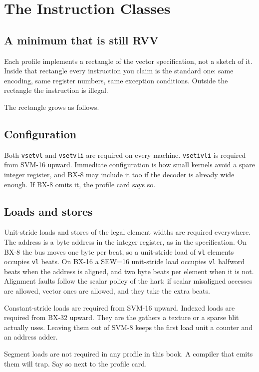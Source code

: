 \chapter{The Instruction Classes}
\label{ch:instructions}

\section{A minimum that is still RVV}

Each profile implements a rectangle of the vector specification, not a sketch of it. Inside that rectangle every instruction you claim is the standard one: same encoding, same register numbers, same exception conditions. Outside the rectangle the instruction is illegal.

The rectangle grows as follows.

\section{Configuration}

Both \texttt{vsetvl} and \texttt{vsetvli} are required on every machine. \texttt{vsetivli} is required from SVM-16 upward. Immediate configuration is how small kernels avoid a spare integer register, and BX-8 may include it too if the decoder is already wide enough. If BX-8 omits it, the profile card says so.

\section{Loads and stores}

Unit-stride loads and stores of the legal element widths are required everywhere. The address is a byte address in the integer register, as in the specification. On BX-8 the bus moves one byte per beat, so a unit-stride load of \texttt{vl} elements occupies \texttt{vl} beats. On BX-16 a SEW=16 unit-stride load occupies \texttt{vl} halfword beats when the address is aligned, and two byte beats per element when it is not. Alignment faults follow the scalar policy of the hart: if scalar misaligned accesses are allowed, vector ones are allowed, and they take the extra beats.

Constant-stride loads are required from SVM-16 upward. Indexed loads are required from BX-32 upward. They are the gathers a texture or a sparse blit actually uses. Leaving them out of SVM-8 keeps the first load unit a counter and an address adder.

Segment loads are not required in any profile in this book. A compiler that emits them will trap. Say so next to the profile card.

